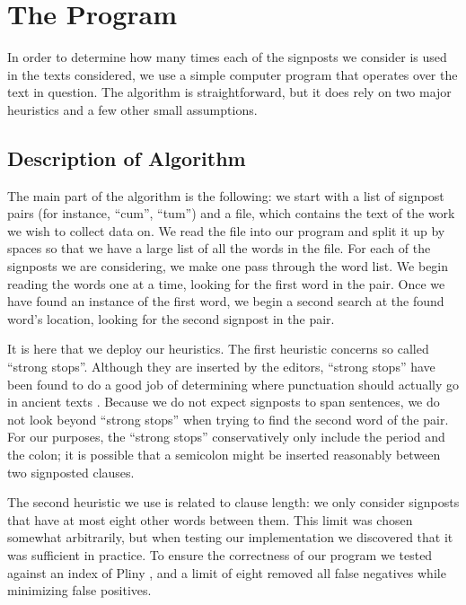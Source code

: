 \section{The Program}
\label{sec:The Program}

In order to determine how many times each of the signposts we consider is used in the texts considered, we use a simple computer program that operates over the text in question. The algorithm is straightforward, but it does rely on two major heuristics and a few other small assumptions.

\subsection{Description of Algorithm}

The main part of the algorithm is the following: we start with a list of signpost pairs (for instance, ``cum'', ``tum'') and a file, which contains the text of the work we wish to collect data on. We read the file into our program and split it up by spaces so that we have a large list of all the words in the file. For each of the signposts we are considering, we make one pass through the word list. We begin reading the words one at a time, looking for the first word in the pair. Once we have found an instance of the first word, we begin a second search at the found word's location, looking for the second signpost in the pair.

It is here that we deploy our heuristics. The first heuristic concerns so called ``strong stops''. Although they are inserted by the editors, ``strong stops'' have been found to do a good job of determining where punctuation should actually go in ancient texts \cite{strongstop}. Because we do not expect signposts to span sentences, we do not look beyond ``strong stops'' when trying to find the second word of the pair. For our purposes, the ``strong stops'' conservatively only include the period and the colon; it is possible that a semicolon might be inserted reasonably between two signposted clauses.

The second heuristic we use is related to clause length: we only consider signposts that have at most eight other words between them. This limit was chosen somewhat arbitrarily, but when testing our implementation we discovered that it was sufficient in practice. To ensure the correctness of our program we tested against an index of Pliny \cite{index}, and a limit of eight removed all false negatives while minimizing false positives.

